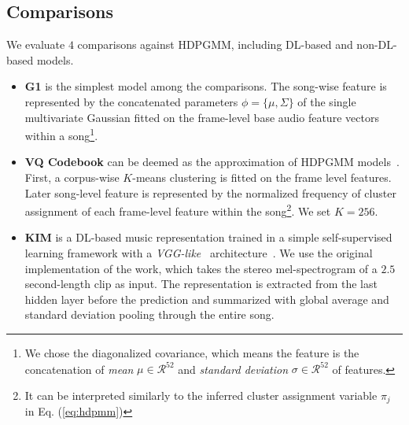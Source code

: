 \documentclass{article}
\begin{document}
\subsection{Comparisons}\label{sec:experimental_setup:comparisons}

We evaluate $4$ comparisons against HDPGMM, including DL-based and non-DL-based models.

\begin{itemize}[noitemsep, leftmargin=*]
    \item \textbf{G1} is the simplest model among the comparisons. The song-wise feature is represented by the concatenated parameters $\phi = \{\mu, \Sigma\}$ of the single multivariate Gaussian fitted on the frame-level base audio feature vectors within a song\footnote{We chose the diagonalized covariance, which means the feature is the concatenation of \emph{mean} $\mu\in\mathcal{R}^{52}$ and \emph{standard deviation} $\sigma\in\mathcal{R}^{52}$ of features.}.

    \item \textbf{VQ Codebook} can be deemed as the approximation of HDPGMM models~\cite{DBLP:conf/ismir/HoffmanBC08}. First, a corpus-wise $K$-means clustering is fitted on the frame level features. Later song-level feature is represented by the normalized frequency of cluster assignment of each frame-level feature within the song\footnote{It can be interpreted similarly to the inferred cluster assignment variable $\pi_{j}$ in Eq. (\ref{eq:hdpmm})}. We set $K=256$.

    \item \textbf{KIM} is a DL-based music representation trained in a simple self-supervised learning framework with a \emph{VGG-like}~\cite{DBLP:journals/corr/SimonyanZ14a} architecture~\cite{DBLP:journals/nca/KimULH20}.
    We use the original implementation of the work, which takes the stereo mel-spectrogram of a $2.5$ second-length clip as input. The representation is extracted from the last hidden layer before the prediction and summarized with global average and standard deviation pooling through the entire song.


\end{itemize}
\end{document}
